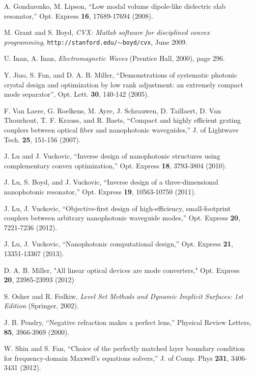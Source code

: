 \begin{thebibliography}{99}
 A. Gondarenko, M. Lipson, ``Low modal volume dipole-like dielectric slab resonator,'' Opt. Express \textbf{16}, 17689-17694 (2008).

 M. Grant and S. Boyd, \emph{CVX: Matlab software for disciplined convex programming}, \texttt{http://stanford.edu/$\sim$boyd/cvx}, June 2009.

 U. Inan, A. Inan, \emph{Electromagnetic Waves} (Prentice Hall, 2000), page 296.

 Y. Jiao, S. Fan, and D. A. B. Miller, 
    ``Demonstrations of systematic photonic crystal design and optimization by low rank adjustment: an extremely compact mode separator'', Opt. Lett. \textbf{30}, 140-142 (2005).

F. Van Laere, G. Roelkens, M. Ayre, J. Schrauwen, D. Taillaert, D. Van Thourhout, T. F. Krauss, and R. Baets,
    ``Compact and highly efficient grating couplers between optical fiber and nanophotonic waveguides,''
    J. of Lightwave Tech. \textbf{25}, 151-156 (2007).

 J. Lu and J. Vuckovic, ``Inverse design of nanophotonic structures using complementary convex optimization,'' Opt. Express \textbf{18}, 3793-3804 (2010).

 J. Lu, S. Boyd, and J. Vuckovic, 
    ``Inverse design of a three-dimensional nanophotonic resonator,''
    Opt. Express \textbf{19}, 10563-10750 (2011). 

 J. Lu, J. Vuckovic, ``Objective-first design of high-efficiency, small-footprint couplers between arbitrary nanophotonic waveguide modes,'' 
    Opt. Express \textbf{20}, 7221-7236 (2012).

 J. Lu, J. Vuckovic, ``Nanophotonic computational design,'' 
    Opt. Express \textbf{21}, 13351-13367 (2013).

 D. A. B. Miller, "All linear optical devices are mode converters," Opt. Express \textbf{20}, 23985-23993 (2012)

 S. Osher and R. Fedkiw, \emph{Level Set Methods and Dynamic Implicit Surfaces: 1st Edition} (Springer, 2002).

 J. B. Pendry, ``Negative refraction makes a perfect lens,''
    Physical Review Letters, \textbf{85}, 3966-3969 (2000).

 W. Shin and S. Fan, ``Choice of the perfectly matched layer boundary condition for frequency-domain Maxwell’s equations solvers,''
    J. of Comp. Phys \textbf{231}, 3406-3431 (2012).
 

\end{thebibliography}
